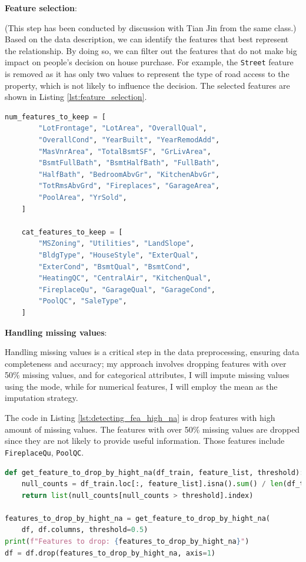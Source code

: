 \documentclass[10pt]{article}
\begin{document}
\textbf{Feature selection}: 

(This step has been conducted by discussion with Tian Jin from the same class.) Based on the data description, we can identify the features that best represent the relationship. By doing so, we can filter out the features that do not make big impact on people's decision on house purchase. For example, the \texttt{Street} feature is removed as it has only two values to represent the type of road access to the property, which is not likely to influence the decision. The selected features are shown in Listing \ref{lst:feature_selection}.

\begin{lstlisting}[language=Python, label={lst:feature_selection}, caption={Features selected with human knowledge}]
    num_features_to_keep = [
        "LotFrontage", "LotArea", "OverallQual",
        "OverallCond", "YearBuilt", "YearRemodAdd",
        "MasVnrArea", "TotalBsmtSF", "GrLivArea",
        "BsmtFullBath", "BsmtHalfBath", "FullBath",
        "HalfBath", "BedroomAbvGr", "KitchenAbvGr",
        "TotRmsAbvGrd", "Fireplaces", "GarageArea",
        "PoolArea", "YrSold",
    ]

    cat_features_to_keep = [
        "MSZoning", "Utilities", "LandSlope",
        "BldgType", "HouseStyle", "ExterQual",
        "ExterCond", "BsmtQual", "BsmtCond",
        "HeatingQC", "CentralAir", "KitchenQual",
        "FireplaceQu", "GarageQual", "GarageCond",
        "PoolQC", "SaleType",
    ]
\end{lstlisting}

\textbf{Handling missing values}: 

Handling missing values is a critical step in the data preprocessing, ensuring data completeness and accuracy; my approach involves dropping features with over 50\% missing values, and for categorical attributes, I will impute missing values using the mode, while for numerical features, I will employ the mean as the imputation strategy.

The code in Listing \ref{lst:detecting_fea_high_na} is drop features with high amount of missing values. The features with over 50\% missing values are dropped since they are not likely to provide useful information. Those features include \texttt{FireplaceQu}, \texttt{PoolQC}.

\begin{lstlisting}[language=Python, label={lst:detecting_fea_high_na}, caption={Drop the features with high amount of missing values}]
def get_feature_to_drop_by_hight_na(df_train, feature_list, threshold):
    null_counts = df_train.loc[:, feature_list].isna().sum() / len(df_train)
    return list(null_counts[null_counts > threshold].index)

features_to_drop_by_hight_na = get_feature_to_drop_by_hight_na(
    df, df.columns, threshold=0.5)
print(f"Features to drop: {features_to_drop_by_hight_na}")
df = df.drop(features_to_drop_by_hight_na, axis=1)
\end{lstlisting}
\end{document}
